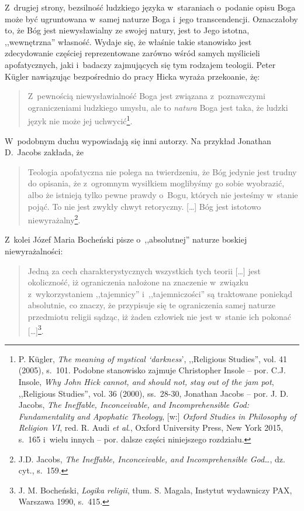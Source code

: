 Z~drugiej strony, bezsilność ludzkiego języka w~staraniach o~podanie opisu Boga może być ugruntowana w~samej naturze Boga i~jego transcendencji. Oznaczałoby to, że Bóg jest niewysławialny ze swojej natury, jest to Jego istotna, ,,wewnętrzna'' własność. Wydaje się, że właśnie takie stanowisko jest zdecydowanie częściej reprezentowane zarówno wśród samych myślicieli apofatycznych, jaki i~badaczy zajmujących się tym rodzajem teologii. Peter Kügler nawiązując bezpośrednio do pracy Hicka wyraża przekoanie, żę:

\begin{quote}
Z~pewnością niewysławialność Boga jest związana z~poznawczymi ograniczeniami ludzkiego umysłu, ale to \textit{natura} Boga jest taka, że ludzki język nie może jej uchwycić\footnote{P. Kügler, \textit{The meaning of mystical ‘darkness}', ,,Religious Studies'', vol. 41 (2005), s.~101. Podobne stanowisko zajmuje Christopher Insole -- por. C.J. Insole, \textit{Why John Hick cannot, and should not, stay out of the jam pot}, ,,Religious Studies'', vol. 36 (2000), ss.~28-30, Jonathan Jacobs -- por. J. D. Jacobs, \textit{The Ineffable, Inconceivable, and Incomprehensible God: Fundamentality and Apophatic Theology}, [w:] \textit{Oxford Studies in Philosophy of Religion VI}, red. R. Audi \textit{et al}., Oxford University Press, New York 2015, s.~165 i~wielu innych -- por. dalsze części niniejszego rozdziału.}.
\end{quote}

W~podobnym duchu wypowiadają się inni autorzy. Na przykład Jonathan D.~Jacobs zakłada, że

\begin{quote}
Teologia apofatyczna nie polega na twierdzeniu, że Bóg jedynie jest trudny do opisania, że z~ogromnym wysiłkiem moglibyśmy go sobie wyobrazić, albo że istnieją tylko pewne prawdy o~Bogu, których nie jesteśmy w~stanie pojąć. To nie jest zwykły chwyt retoryczny. [\ldots] Bóg jest istotowo niewyrażalny\footnote{J.D. Jacobs, \textit{The Ineffable, Inconceivable, and Incomprehensible God}\ldots, dz. cyt., s.~159.}.
\end{quote}
Z~kolei Józef Maria Bocheński pisze o~,,absolutnej'' naturze boskiej niewyrażalności:

\begin{quote}
Jedną za cech charakterystycznych wszystkich tych teorii [\ldots] jest okoliczność, iż ograniczenia nałożone na znaczenie w~związku z~wykorzystaniem ,,tajemnicy'' i~,,tajemniczości'' są traktowane poniekąd absolutnie, co znaczy, że przypisuje się te ograniczenia samej naturze przedmiotu religii sądząc, iż żaden człowiek nie jest w~stanie ich pokonać [\ldots]\footnote{J. M. Bocheński, \textit{Logika religii}, tłum. S. Magala, Instytut wydawniczy PAX, Warszawa 1990, s.~415.}.
\end{quote}

